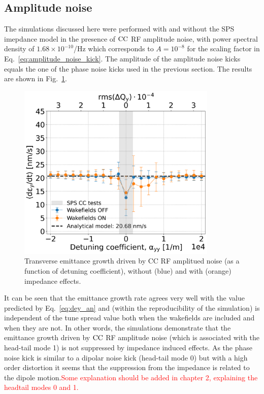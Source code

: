 \subsection{Amplitude noise}\label{subsec:amplitude_noise}
The simulations discussed here were performed with and without the SPS imepdance model in the presence of ${\mathrm{CC}}$ RF amplitude noise, with power spectral density of $1.68 \times 10^{-10}$/Hz which corresponds to $A=10^{-8}$ for the scaling factor in Eq.~\eqref{eq:amplitude_noise_kick}. The amplitude of the amplitude noise kicks equals the one of the phase noise kicks used in the previous section. The results are shown in Fig.~\ref{fig:study_1_2018_paramters_AN}.

\begin{figure}[!h] %
    \centering         
    \includegraphics[width=0.85\textwidth]{images/Ch7/deyRates_final_2018_AN_sps_270GeV_AN1e-8_400MHz_y-plane_QpxQpy5e-1_6D_Nb5e5_intensity3e10_ayyScan_wakesON_vs_OFF_vs_TuneSpreadvsExpectedSPS.png}
        \caption{Transverse emittance growth driven by CC RF amplitued noise (as a function of detuning coefficient), without (blue) and with (orange) impedance effects.}
        \label{fig:study_1_2018_paramters_AN}
 \end{figure}

 It can be seen that the emittance growth rate agrees very well with the value predicted by Eq.~\eqref{eq:dey_an} and (within the reproducibility of the simulation) is independent of the tune spread value both when the wakefields are included and when they are not. In other words, the simulations demonstrate that the emittance growth driven by ${\mathrm{CC}}$ RF amplitude noise (which is associated with the head-tail mode 1) is not suppressed by impedance induced effects. As the phase noise kick is similar to a dipolar noise kick (head-tail mode 0) but with a high order distortion it seems that the suppression from the impedance is related to the dipole motion.\textcolor{red}{Some explanation should be added in chapter 2, explaining the headtail modes 0 and 1.}

